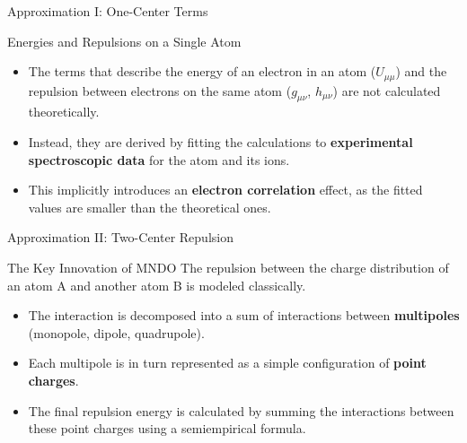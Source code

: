 
\begin{frame}{Approximation I: One-Center Terms}
    \begin{block}{Energies and Repulsions on a Single Atom}
        \begin{itemize}
            \item The terms that describe the energy of an electron in an atom ($U_{\mu\mu}$) and the repulsion between electrons on the same atom ($g_{\mu\nu}$, $h_{\mu\nu}$) are not calculated theoretically.
            \pause
            \bigskip
            \item Instead, they are derived by fitting the calculations to \textbf{experimental spectroscopic data} for the atom and its ions.
            \pause
            \bigskip
            \item This implicitly introduces an \textbf{electron correlation} effect, as the fitted values are smaller than the theoretical ones.
        \end{itemize}
    \end{block}
\end{frame}


\begin{frame}{Approximation II: Two-Center Repulsion}
    \begin{alertblock}{The Key Innovation of MNDO}
        The repulsion between the charge distribution of an atom A and another atom B is modeled classically.
    \end{alertblock}
    \pause
    
    \begin{itemize}
        \item The interaction is decomposed into a sum of interactions between \textbf{multipoles} (monopole, dipole, quadrupole).
        \pause
        \bigskip
        \item Each multipole is in turn represented as a simple configuration of \textbf{point charges}.
        \pause
        \bigskip
        \item The final repulsion energy is calculated by summing the interactions between these point charges using a semiempirical formula.
    \end{itemize}
\end{frame}



